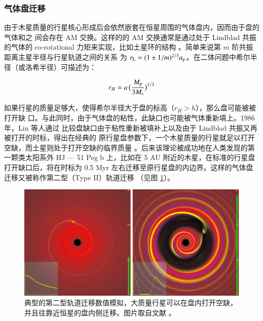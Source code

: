 \subsubsection{气体盘迁移} \label{sec:diskmig}

由于木星质量的行星核心形成后会依然嵌套在恒星周围的气体盘内，因而由于盘的气体和之
间会存在 AM 交换。这样的的 AM 交换通常是通过处于 Lindblad 共振的气体的 co-rotational 
力矩来实现\cite{Binney1987,GoldreichTremaine1979}，比如土星环的结构
\cite{GoldreichTremaine1980}。简单来说第 $m$ 阶共振距离主星半径与行星轨道之间的关系
为 $r_\mathrm{L} = (1\pm 1/m)^{2/3} a_\mathrm{p}$。在二体问题中希尔半径（或洛希半径）可描述为：

\begin{equation} \label{eq:hillradius}
r_H = a \, \big( \frac{M_\mathrm{p}}{3M_\mathrm{s}} \big) ^{1/3}
\end{equation} 

如果行星的质量足够大，使得希尔半径大于盘的标高（$r_H > h$），那么盘可能被被打开缺
口。与此同时，由于气体盘的粘性，此缺口也可能被气体重新填上。1986 年，Lin 等人通过
比较盘缺口由于粘性重新被填补上以及由于 Lindblad 共振又再被打开的时标，得出在经典的
原行星盘参数下，一个木星质量的行星就足以打开空缺，而土星则处于打开空缺的临界质量
\cite{Lin1986,Ward1997}。后来该理论被成功地在人类发现的第一颗类太阳系外 HJ --- 51 Peg
 b 上\cite{Lin1996}，比如在 5 AU 附近的木星，在标准的行星盘打开缺口后，将在时标为 0.5 
 Myr 左右迁移至原行星盘的内边界。这样的气体盘迁移又被称作第二型（Type II）轨道迁移
 （见图 \ref{fig:diskmig}）。

\begin{figure}[t]
\centering
\includegraphics[width=1.0\textwidth]{figures/chapter4/fig3_diskmig.eps}
\caption[典型的第二型轨道迁移数值模拟，大质量行星可以在盘内打开空缺，并且往靠近恒星的盘内侧迁移。图片版权 Armitage\/Rice。]{典型的第二型轨道迁移数值模拟，大质量行星可以在盘内打开空缺，并且往靠近恒星的盘内侧迁移。图片取自文献 。}
\label{fig:diskmig}
\end{figure}



